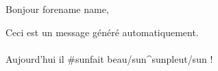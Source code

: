 \documentclass[a4paper,12pt]{article}
\begin{document}
\indent Bonjour {{{forename}}} {{{name}}},\\

\vspace{2cm}

\noindent Ceci est un message généré automatiquement.\\
\\
Aujourd'hui il {{#sun}}fait beau{{/sun}}{{^sun}}pleut{{/sun}} !
\end{document}

